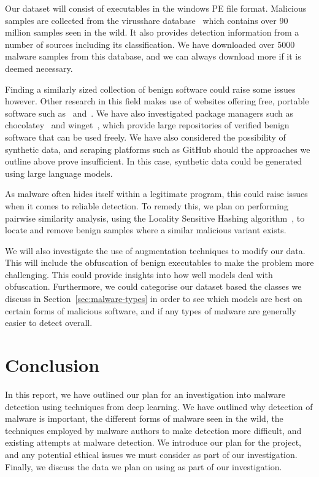 \documentclass[twocolumn]{article}
\begin{document}
Our dataset will consist of executables in the windows PE file format. Malicious samples are collected from the virusshare database~\cite{noauthor_virussharecom_nodate} which contains over 90 million samples seen in the wild. It also provides detection information from a number of sources including its classification. We have downloaded over 5000 malware samples from this database, and we can always download more if it is deemed necessary.  

Finding a similarly sized collection of benign software could raise some issues however. Other research in this field makes use of websites offering free, portable software such as~\cite{noauthor_portableappscom_nodate} and~\cite{noauthor_latest_nodate}. We have also investigated package managers such as chocolatey~\cite{noauthor_chocolatey_nodate} and winget~\cite{noauthor_microsoftwinget-cli_2025}, which provide large repositories of verified benign software that can be used freely. We have also considered the possibility of synthetic data, and scraping platforms such as GitHub should the approaches we outline above prove insufficient. In this case, synthetic data could be generated using large language models.

As malware often hides itself within a legitimate program, this could raise issues when it comes to reliable detection. To remedy this, we plan on performing pairwise similarity analysis, using the Locality Sensitive Hashing algorithm~\cite{leskovec2020mining}, to locate and remove benign samples where a similar malicious variant exists. 

We will also investigate the use of augmentation techniques to modify our data. This will include the obfuscation of benign executables to make the problem more challenging. This could provide insights into how well models deal with obfuscation. Furthermore, we could categorise our dataset based the classes we discuss in Section~\ref{sec:malware-types} in order to see which models are best on certain forms of malicious software, and if any types of malware are generally easier to detect overall. 

\section{Conclusion}

In this report, we have outlined our plan for an investigation into malware detection using techniques from deep learning. We have outlined why detection of malware is important, the different forms of malware seen in the wild, the techniques employed by malware authors to make detection more difficult, and existing attempts at malware detection. We introduce our plan for the project, and any potential ethical issues we must consider as part of our investigation. Finally, we discuss the data we plan on using as part of our investigation.  

\printbibliography
\end{document}
